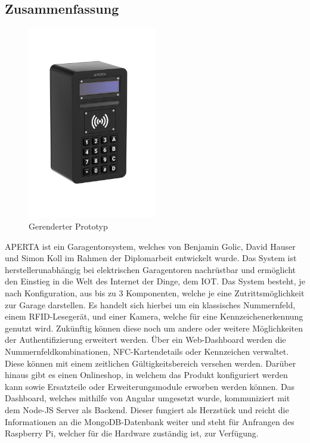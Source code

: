 \newpage
\begin{spacing}{1}
  \chapter*{Zusammenfassung}
\end{spacing}
\begin{figure}
  \begin{center}
    \includegraphics[width=0.5\textwidth]{pics/all-in-package.png}
    \caption{Gerenderter Prototyp}
  \end{center}
\end{figure}
APERTA ist ein Garagentorsystem, welches von Benjamin Golic, David Hauser und Simon Koll im Rahmen der Diplomarbeit entwickelt wurde. Das System ist herstellerunabhängig bei elektrischen Garagentoren nachrüstbar und ermöglicht den Einstieg in die Welt des Internet der Dinge, dem IOT. Das System besteht, je nach Konfiguration, aus bis zu 3 Komponenten, welche je eine Zutrittsmöglichkeit zur Garage darstellen. Es handelt sich hierbei um ein klassisches Nummernfeld, einem RFID-Lesegerät, und einer Kamera, welche für eine Kennzeichenerkennung genutzt wird. Zukünftig können diese noch um andere oder weitere Möglichkeiten der Authentifizierung erweitert werden. Über ein Web-Dashboard werden die Nummernfeldkombinationen, NFC-Kartendetails oder Kennzeichen verwaltet. Diese können mit einem zeitlichen Gültigkeitsbereich versehen werden. Darüber hinaus gibt es einen Onlineshop, in welchem das Produkt konfiguriert werden kann sowie Ersatzteile oder Erweiterungsmodule erworben werden können. Das Dashboard, welches mithilfe von Angular umgesetzt wurde, kommuniziert mit dem Node-JS Server als Backend. Dieser fungiert als Herzstück und reicht die Informationen an die MongoDB-Datenbank weiter und steht für Anfrangen des Raspberry Pi, welcher für die Hardware zuständig ist, zur Verfügung.



